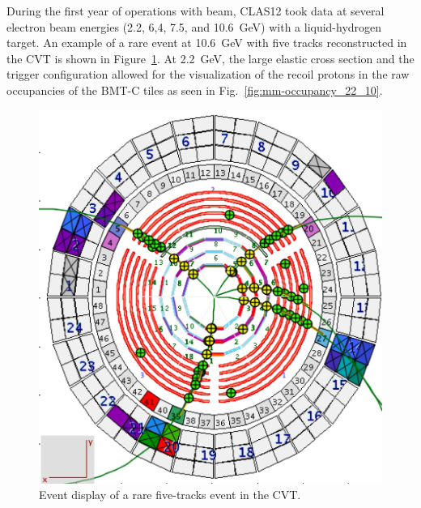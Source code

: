 During the first year of operations with beam, CLAS12 took data at several electron beam energies (2.2, 6,4, 7.5, and 10.6~GeV)
with a liquid-hydrogen target. An example of a rare event at 10.6~GeV with five tracks reconstructed in the CVT is 
shown in Figure~\ref{fig:cd-tracks}. At 2.2~GeV, the large elastic cross section and the trigger configuration allowed 
for the visualization of the recoil protons in the raw occupancies of the BMT-C tiles as seen in 
Fig.~\ref{fig:mm-occupancy_22_10}. 

\begin{figure}[htb]
 \includegraphics[width=.9\columnwidth]{images/cd-tracks}
 \caption{Event display of a rare five-tracks event in the CVT.}
 \label{fig:cd-tracks}
\end{figure}


